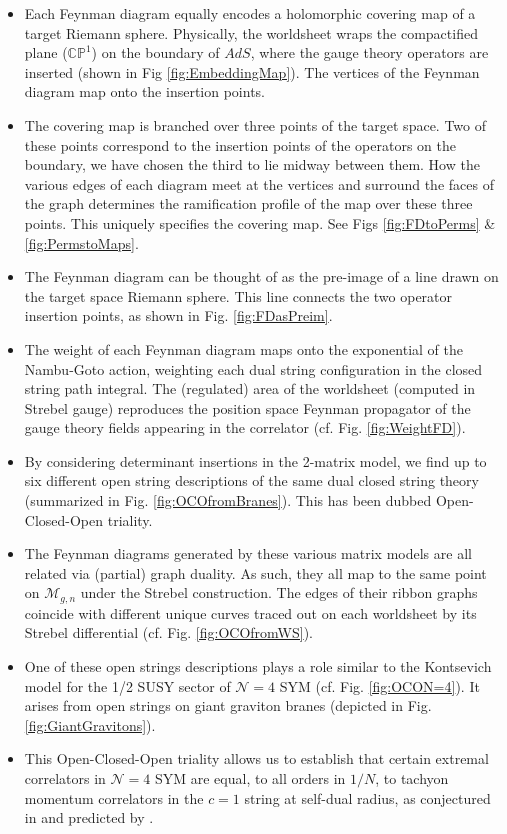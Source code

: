 \documentclass[english]{article}
\renewcommand{\>}{\rangle}
\newcommand{\<}{\langle}
\renewcommand{\(}{\left(}
\renewcommand{\)}{\right)}
\begin{document}
\begin{itemize}
    \item Each Feynman diagram equally encodes a holomorphic covering map of a target Riemann sphere. Physically, the worldsheet wraps the compactified plane ($\mathbb{CP}^{1}$) on the boundary of $AdS$, where the gauge theory operators are inserted (shown in Fig \ref{fig:EmbeddingMap}). The vertices of the Feynman diagram map onto the insertion points.
    
    \item The covering map is branched over three points of the target space. Two of these points correspond to the insertion points of the operators on the boundary, we have chosen the third to lie midway between them. How the various edges of each diagram meet at the vertices and surround the faces of the graph determines the ramification profile of the map over these three points. This uniquely specifies the covering map. See Figs \ref{fig:FDtoPerms} \& \ref{fig:PermstoMaps}.
    \item The Feynman diagram can be thought of as the pre-image of a line drawn on the target space Riemann sphere. This line connects the two operator insertion points, as shown in Fig. \ref{fig:FDasPreim}.
    
    \item The weight of each Feynman diagram maps onto the exponential of the Nambu-Goto action, weighting each dual string configuration in the closed string path integral. The (regulated) area of the worldsheet (computed in Strebel gauge) reproduces the position space Feynman propagator of the gauge theory fields appearing in the correlator (cf. Fig. \ref{fig:WeightFD}).
    
    \item By considering determinant insertions in the 2-matrix model, we find up to six different open string descriptions of the same dual closed string theory (summarized in Fig. \ref{fig:OCOfromBranes}). This has been dubbed Open-Closed-Open triality. 
    
    \item The Feynman diagrams generated by these various matrix models are all related via (partial) graph duality. As such, they all map to the same point on $\mathcal{M}_{g,n}$ under the Strebel construction. The edges of their ribbon graphs coincide with different unique curves traced out on each worldsheet by its Strebel differential (cf. Fig. \ref{fig:OCOfromWS}).
    
    \item One of these open strings descriptions plays a role similar to the Kontsevich model for the 1/2 SUSY sector of $\mathcal{N}=4$ SYM (cf. Fig. \ref{fig:OCON=4}). It arises from open strings on giant graviton branes (depicted in Fig. \ref{fig:GiantGravitons}). 
    
    \item This Open-Closed-Open triality allows us to establish that certain extremal correlators in $\mathcal{N}=4$ SYM are equal, to all orders in $1/N$, to tachyon momentum correlators in the $c=1$ string at self-dual radius, as conjectured in \cite{Jevicki:2006tr,halfBPSc=1followup} and predicted by \cite{AlexandrovNormal,brown2011complex}. 
\end{itemize}
\end{document}
